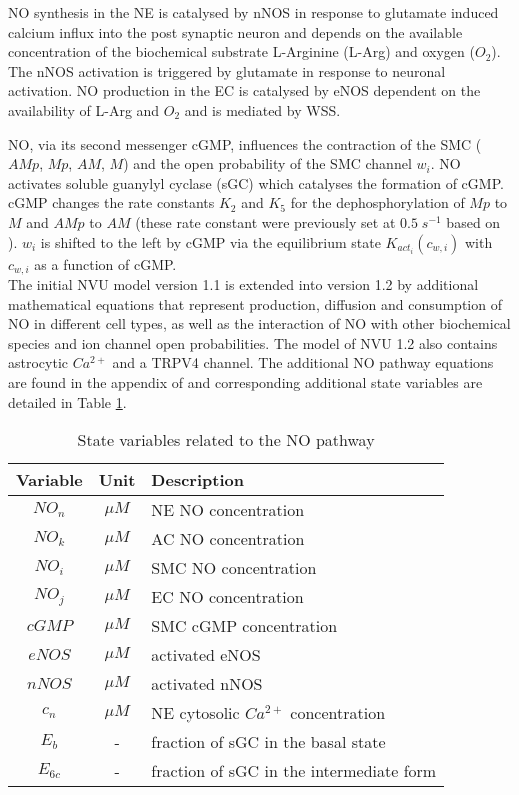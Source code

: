 		NO synthesis in the NE is catalysed by nNOS in response to glutamate induced calcium influx into the post synaptic neuron and depends on the available concentration of the biochemical substrate L-Arginine (L-Arg) and oxygen ($O_2$). The nNOS activation is triggered by glutamate in response to neuronal activation. 
		NO production in the EC is catalysed by eNOS dependent on the availability of L-Arg and $O_2$ and is mediated by WSS. 
	
		NO, via its second messenger cGMP, influences the contraction of the SMC ($AMp$, $Mp$, $AM$, $M$) and the open probability of the SMC \pot channel $w_i$. NO activates soluble guanylyl cyclase (sGC) which catalyses the formation of cGMP. cGMP changes the rate constants $K_2$ and $K_5$ for the dephosphorylation of $Mp$ to $M$ and $AMp$ to $AM$ (these rate constant were previously set at $0.5 \; s^{-1}$ based on \citet{Koenigsberger2006}). $w_i$ is shifted to the left by cGMP via the equilibrium state $K_{act_i} (c_{w,i})$ with $c_{w,i}$ as a function of cGMP.
		\\
		
		The initial NVU model version 1.1 is extended into version 1.2 by additional mathematical equations that represent production, diffusion and consumption of NO in different cell types, as well as the interaction of NO with other biochemical species and ion channel open probabilities. The model of NVU 1.2 also contains astrocytic $Ca^{2+}$ and a TRPV4 channel. 		
		The additional NO pathway equations are found in the appendix of \cite{Dormanns2016} and corresponding additional state variables are detailed in Table \ref{tab:NVU12}. 		

		\begin{table}[h!]
			\small
			\centering
				\begin{tabular}{c c l}
			\hline
			Variable & Unit & Description \\
			\hline
			$NO_n$ & $\mu M$ & NE NO concentration \\
			$NO_k$ & $\mu M$ & AC NO concentration \\
			$NO_i$ & $\mu M$ & SMC NO concentration \\
			$NO_j$ & $\mu M$ & EC NO concentration \\
			$cGMP$ & $\mu M$ & SMC cGMP concentration \\
			$eNOS$ & $\mu M$ & activated eNOS \\
			$nNOS$ & $\mu M$ & activated nNOS \\
			$c_n$ & $\mu M$ & NE cytosolic $Ca^{2+}$ concentration \\
			$E_b$ & - & fraction of sGC in the basal state \\
			$E_{6c}$ & - & fraction of sGC in the intermediate form \\
			\hline
				\end{tabular}
				\caption{State variables related to the NO pathway}
				\label{tab:NVU12}
		\end{table}
		

